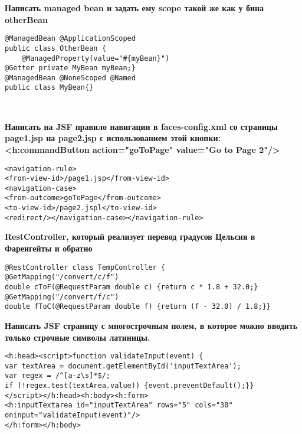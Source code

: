 \documentclass{article}
\begin{document}
\hfill
\begin{minipage}[t]{0.3\textwidth}
    \textbf{Написать managed bean и задать ему scope такой же как у бина otherBean}
    \begin{lstlisting}[frame=single, basicstyle=\tiny\ttfamily, breaklines=true, breakatwhitespace=true, postbreak=\mbox{\textcolor{red}{$\hookrightarrow$}\space}]
@ManagedBean @ApplicationScoped
public class OtherBean {
    @ManagedProperty(value="#{myBean}")
@Getter private MyBean myBean;}
@ManagedBean @NoneScoped @Named
public class MyBean{}
    \end{lstlisting}
\end{minipage}%
\\

\begin{minipage}[t]{0.3\textwidth}
    \textbf{Написать на JSF правило навигации в faces-config.xml со страницы page1.jsp на page2.jsp с использованием этой кнопки: <h:commandButton action="goToPage" value="Go to Page 2"/>}
    \begin{lstlisting}[frame=single, basicstyle=\tiny\ttfamily, breaklines=true, breakatwhitespace=true, postbreak=\mbox{\textcolor{red}{$\hookrightarrow$}\space}]
<navigation-rule>
<from-view-id>/page1.jsp</from-view-id>
<navigation-case>
<from-outcome>goToPage</from-outcome>
<to-view-id>/page2.jspl</to-view-id>
<redirect/></navigation-case></navigation-rule>
    \end{lstlisting}
\end{minipage}%
\hfill
\begin{minipage}[t]{0.3\textwidth}
    \textbf{RestController, который реализует перевод градусов Цельсия в Фаренгейты и обратно}
    \begin{lstlisting}[frame=single, basicstyle=\tiny\ttfamily, breaklines=true, breakatwhitespace=true, postbreak=\mbox{\textcolor{red}{$\hookrightarrow$}\space}]
@RestController class TempController {
@GetMapping("/convert/c/f")
double cToF(@RequestParam double c) {return c * 1.8 + 32.0;}
@GetMapping("/convert/f/c")
double fToC(@RequestParam double f) {return (f - 32.0) / 1.8;}}
    \end{lstlisting}
\end{minipage}%
\hfill
\begin{minipage}[t]{0.3\textwidth}
    \textbf{Написать JSF страницу с многострочным полем, в которое можно вводить только строчные символы латиницы.}
    \begin{lstlisting}[frame=single, basicstyle=\tiny\ttfamily, breaklines=true, breakatwhitespace=true, postbreak=\mbox{\textcolor{red}{$\hookrightarrow$}\space}]
<h:head><script>function validateInput(event) {
var textArea = document.getElementById('inputTextArea');
var regex = /^[a-z\s]*$/;
if (!regex.test(textArea.value)) {event.preventDefault();}}
</script></h:head><h:body><h:form>
<h:inputTextarea id="inputTextArea" rows="5" cols="30" oninput="validateInput(event)"/>
</h:form></h:body>
    \end{lstlisting}
\end{minipage}%
\\
\end{document}
